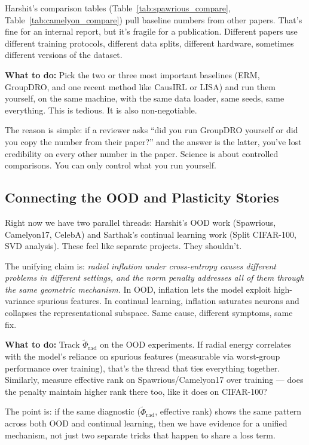 \documentclass[11pt,a4paper]{article}
\begin{document}
Harshit's comparison tables (Table~\ref{tab:spawrious_compare}, Table~\ref{tab:camelyon_compare}) pull baseline numbers from other papers. That's fine for an internal report, but it's fragile for a publication. Different papers use different training protocols, different data splits, different hardware, sometimes different versions of the dataset.

\textbf{What to do:} Pick the two or three most important baselines (ERM, GroupDRO, and one recent method like CausIRL or LISA) and run them yourself, on the same machine, with the same data loader, same seeds, same everything. This is tedious. It is also non-negotiable.

The reason is simple: if a reviewer asks ``did you run GroupDRO yourself or did you copy the number from their paper?'' and the answer is the latter, you've lost credibility on every other number in the paper. Science is about controlled comparisons. You can only control what you run yourself.

\subsection{Connecting the OOD and Plasticity Stories}

Right now we have two parallel threads: Harshit's OOD work (Spawrious, Camelyon17, CelebA) and Sarthak's continual learning work (Split CIFAR-100, SVD analysis). These feel like separate projects. They shouldn't.

The unifying claim is: \emph{radial inflation under cross-entropy causes different problems in different settings, and the norm penalty addresses all of them through the same geometric mechanism}. In OOD, inflation lets the model exploit high-variance spurious features. In continual learning, inflation saturates neurons and collapses the representational subspace. Same cause, different symptoms, same fix.

\textbf{What to do:} Track $\tilde{\Phi}_{\text{rad}}$ on the OOD experiments. If radial energy correlates with the model's reliance on spurious features (measurable via worst-group performance over training), that's the thread that ties everything together. Similarly, measure effective rank on Spawrious/Camelyon17 over training --- does the penalty maintain higher rank there too, like it does on CIFAR-100?

The point is: if the same diagnostic ($\tilde{\Phi}_{\text{rad}}$, effective rank) shows the same pattern across both OOD and continual learning, then we have evidence for a unified mechanism, not just two separate tricks that happen to share a loss term.
\end{document}
